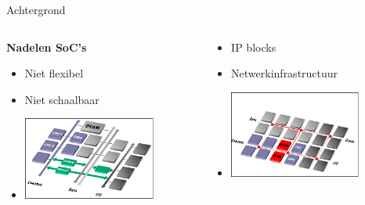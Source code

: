 \documentclass[10pt]{beamer}
\begin{document}
\begin{frame}[label=achtergrond2]{Achtergrond}

    \begin{columns}
        \begin{column}[t]{5cm}
            {\bf Nadelen SoC's}
            \begin{itemize}
                \item <1->Niet flexibel
                \item <1->Niet schaalbaar
                \item <1->\includegraphics[width=0.75\textwidth]{trad-bus}
            \end{itemize}
        \end{column}
        \begin{column}[t]{5cm}
            \begin{itemize}
                \item <2->IP blocks
                \item <2->Netwerkinfrastructuur
                \item <2->\includegraphics[width=0.75\textwidth]{switch-fabric}
            \end{itemize}
        \end{column}
    \end{columns}

\end{frame}
\end{document}
